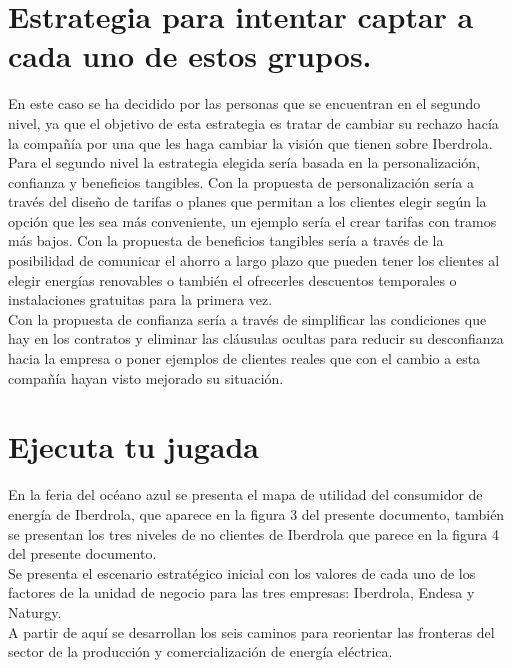 \documentclass{article}
\begin{document}
\section{Estrategia para intentar captar a cada uno de
estos grupos.}
En este caso se ha decidido por las personas que se encuentran en el segundo nivel, ya que el objetivo de esta estrategia es tratar de cambiar su rechazo hacía la compañía por una que les haga cambiar la visión que tienen sobre Iberdrola. \\
Para el segundo nivel la estrategia elegida sería basada en la personalización, confianza y beneficios tangibles.
Con la propuesta de personalización sería a través del diseño de tarifas o planes que permitan a los clientes elegir según la opción que les sea más conveniente, un ejemplo sería el crear tarifas con tramos más bajos.
Con la propuesta de beneficios tangibles sería a través de la posibilidad de comunicar el ahorro a largo plazo que pueden tener los clientes al elegir energías renovables o también el ofrecerles descuentos temporales o instalaciones gratuitas para la primera vez. \\
Con la propuesta de confianza sería a través de simplificar las condiciones que hay en los contratos y eliminar las cláusulas ocultas para reducir su desconfianza hacia la empresa o poner ejemplos de clientes reales que con el cambio a esta compañía hayan visto mejorado su situación.

\section{Ejecuta tu jugada}
En la feria del océano azul se presenta el mapa de utilidad del consumidor de energía de Iberdrola, que aparece en la figura 3 del presente documento, también se presentan los tres niveles de no clientes de Iberdrola que parece en la figura 4 del presente documento. 
\\

Se presenta el escenario estratégico inicial con los valores de cada uno de los factores de la unidad de negocio para las tres empresas: Iberdrola, Endesa y Naturgy. 
\\

A partir de aquí se desarrollan los seis caminos para reorientar las fronteras del sector de la producción y comercialización de energía eléctrica.
\\
\end{document}

